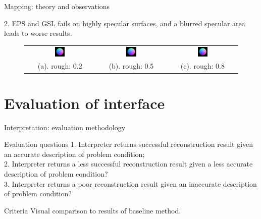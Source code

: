 \documentclass[10pt]{beamer}
\begin{document}
\begin{frame}{Mapping: theory and observations}
\begin{exampleblock}{2. EPS and GSL fails on highly specular surfaces, and a blurred specular area leads to worse results.}
\begin{figure}
\begin{tabular}{ccc}
\includegraphics[width=0.15\textwidth]{mapping/ps_spec_rough/0802_normal}&
\includegraphics[width=0.15\textwidth]{mapping/ps_spec_rough/0805_normal}&
\includegraphics[width=0.15\textwidth]{mapping/ps_spec_rough/0808_normal}\\
(a). rough: 0.2 & (b). rough: 0.5 & (c). rough: 0.8
\end{tabular}
\end{figure}
\end{exampleblock}

\end{frame}

\section{Evaluation of interface}
\begin{frame}{Interpretation: evaluation methodology}

\begin{exampleblock}{Evaluation questions}
  1. Interpreter returns successful reconstruction result given an accurate description of problem condition; \\
  2. Interpreter returns a less successful reconstruction result given a less accurate description of problem condition? \\
  3. Interpreter returns a poor reconstruction result given an inaccurate description of problem condition? \\
\end{exampleblock}

\begin{exampleblock}{Criteria}
  Visual comparison to results of baseline method.
\end{exampleblock}

\end{frame}
\end{document}
